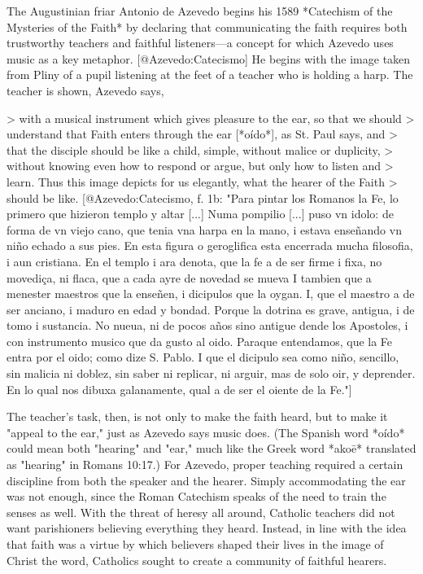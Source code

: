 The Augustinian friar Antonio de Azevedo begins his 1589 *Catechism of the
Mysteries of the Faith* by declaring that communicating the faith requires both
trustworthy teachers and faithful listeners---a concept for which Azevedo uses
music as a key metaphor.
[@Azevedo:Catecismo]
He begins with the image taken from Pliny of a pupil listening at the feet of a
teacher who is holding a harp. 
The teacher is shown, Azevedo says,

> with a musical instrument which gives pleasure to the ear, so that we should
> understand that Faith enters through the ear [*oído*], as St. Paul says, and
> that the disciple should be like a child, simple, without malice or duplicity,
> without knowing even how to respond or argue, but only how to listen and
> learn. Thus this image depicts for us elegantly, what the hearer of the Faith
> should be like. 
[@Azevedo:Catecismo, f. 1b: 
"Para pintar los Romanos la Fe, lo primero que hizieron templo y altar [...]
Numa pompilio [...] puso vn idolo: de forma de vn viejo cano, que tenia vna
harpa en la mano, i estava enseñando vn niño echado a sus pies. En esta figura o
geroglifica esta encerrada mucha filosofia, i aun cristiana. En el templo i ara
denota, que la fe a de ser firme i fixa, no movediça, ni flaca, que a cada ayre
de novedad se mueva I tambien que a menester maestros que la enseñen, i
dicipulos que la oygan. I, que el maestro a de ser anciano, i maduro en edad y
bondad. Porque la dotrina es grave, antigua, i de tomo i sustancia. No nueua, ni
de pocos años sino antigue dende los Apostoles, i con instrumento musico que da
gusto al oido.  Paraque entendamos, que la Fe entra por el oido; como dize S.
Pablo. I que el dicipulo sea como niño, sencillo, sin malicia ni doblez, sin
saber ni replicar, ni arguir, mas de solo oir, y deprender. En lo qual nos
dibuxa galanamente, qual a de ser el oiente de la Fe."]

The teacher's task, then, is not only to make the faith heard, but to make it
"appeal to the ear," just as Azevedo says music does.
(The Spanish word *oído* could mean both "hearing" and "ear," much like the
Greek word *akoē* translated as "hearing" in Romans 10:17.)
For Azevedo, proper teaching required a certain discipline from both the speaker
and the hearer.
Simply accommodating the ear was not enough, since the Roman Catechism speaks of
the need to train the senses as well.
With the threat of heresy all around, Catholic teachers did not want
parishioners believing everything they heard.
Instead, in line with the idea that faith was a virtue by which believers shaped
their lives in the image of Christ the word, Catholics sought to create a
community of faithful hearers.

